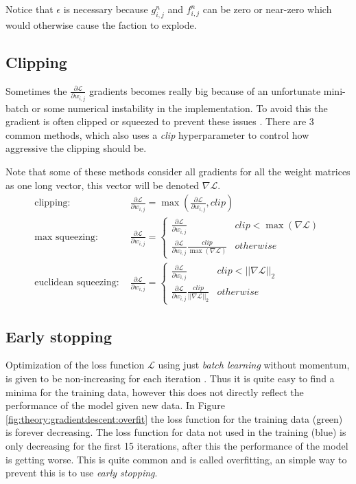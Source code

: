 Notice that $\epsilon$ is necessary because $g_{i,j}^n$ and $f_{i,j}^n$ can be zero or near-zero which would otherwise cause the faction to explode.

\subsection{Clipping}

Sometimes the $\frac{\partial \mathcal{L}}{\partial w_{i,j}}$ gradients becomes really big because of an unfortunate mini-batch or some numerical instability in the implementation. To avoid this the gradient is often clipped or squeezed to prevent these issues \cite{graves-generating-sequences}. There are 3 common methods, which also uses a \textit{clip} hyperparameter to control how aggressive the clipping should be.

Note that some of these methods consider all gradients for all the weight matrices as one long vector, this vector will be denoted $\nabla \mathcal{L}$.
\begin{align}
\text{clipping: } & \frac{\partial \mathcal{L}}{\partial w_{i,j}} = \max\left(\frac{\partial \mathcal{L}}{\partial w_{i,j}}, clip\right) \\
\text{max squeezing: } & \frac{\partial \mathcal{L}}{\partial w_{i,j}} = \begin{cases}
	\frac{\partial \mathcal{L}}{\partial w_{i,j}} & clip < \max(\nabla \mathcal{L}) \\
	\frac{\partial \mathcal{L}}{\partial w_{i,j}} \frac{clip}{\max(\nabla \mathcal{L})} & otherwise
\end{cases} \\
\text{euclidean squeezing: } & \frac{\partial \mathcal{L}}{\partial w_{i,j}} = \begin{cases}
	\frac{\partial \mathcal{L}}{\partial w_{i,j}} & clip < ||\nabla \mathcal{L}||_2 \\
	\frac{\partial \mathcal{L}}{\partial w_{i,j}} \frac{clip}{||\nabla \mathcal{L}||_2} & otherwise
\end{cases}
\end{align}

\subsection{Early stopping}

Optimization of the loss function $\mathcal{L}$ using just \textit{batch learning} without momentum, is given to be non-increasing for each iteration \cite{bishop}. Thus it is quite easy to find a minima for the training data, however this does not directly reflect the performance of the model given new data. In Figure \ref{fig:theory:gradientdescent:overfit} the loss function for the training data (green) is forever decreasing. The loss function for data not used in the training (blue) is only decreasing for the first 15 iterations, after this the performance of the model is getting worse. This is quite common and is called overfitting, an simple way to prevent this is to use \textit{early stopping}.

